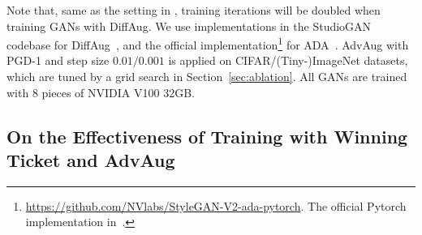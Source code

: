 \documentclass{article}
\begin{document}
Note that, same as the setting in \cite{zhao2020diffaugment}, training iterations will be doubled when training GANs with DiffAug. We use implementations in the StudioGAN codebase for DiffAug~\citep{zhao2020diffaugment}, and the official implementation\footnote{\href{https://github.com/NVlabs/StyleGAN-V2-ada-pytorch}{https://github.com/NVlabs/StyleGAN-V2-ada-pytorch}. The official Pytorch implementation in~\citep{karras2020training}.} for ADA~\citep{karras2020training}. AdvAug with PGD-1 and step size $0.01/0.001$ is applied on CIFAR/(Tiny-)ImageNet datasets, which are tuned by a grid search in Section~\ref{sec:ablation}. All GANs are trained with $8$ pieces of NVIDIA V100 32GB.

\vspace{-0.5em}
\subsection{On the Effectiveness of Training with Winning Ticket and AdvAug} \label{sec:exp}
\vspace{-0.5em}
\end{document}
